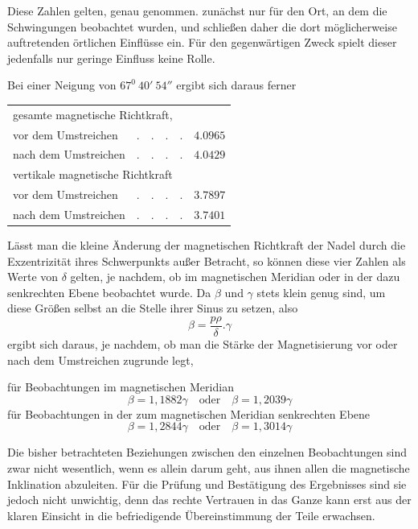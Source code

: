 Diese Zahlen gelten, genau genommen. zunächst nur für den Ort, an dem die Schwingungen beobachtet wurden, und schließen daher die dort möglicherweise auftretenden örtlichen Einflüsse ein. Für den gegenwärtigen Zweck spielt dieser jedenfalls nur geringe Einfluss keine Rolle.

Bei einer Neigung von $67^0\ 40'\ 54''$ ergibt sich daraus ferner
\begin{center}
\begin{tabular}{llr}
\multicolumn{3}{l}{gesamte magnetische Richtkraft,}\\
\quad vor dem Umstreichen&$.\quad.\quad.\quad.$&$4.0965$\\
\quad nach dem Umstreichen&$.\quad.\quad.\quad.$&$4.0429$\\
\multicolumn{3}{l}{vertikale magnetische Richtkraft}\\
\quad vor dem Umstreichen&$.\quad.\quad.\quad.$&$3.7897$\\
\quad nach dem Umstreichen&$.\quad.\quad.\quad.$&$3.7401$
\end{tabular}
\end{center}

Lässt man die kleine Änderung der magnetischen Richtkraft der Nadel durch die Exzentrizität ihres Schwerpunkts außer Betracht, so können diese vier Zahlen als Werte von $\delta$ gelten, je nachdem, ob im magnetischen Meridian oder in der dazu senkrechten Ebene beobachtet wurde. Da $\beta$ und $\gamma$ stets klein genug sind, um diese Größen selbst an die Stelle ihrer Sinus zu setzen, also
\[
\beta=\frac{p\rho}{\delta}.\gamma
\]
ergibt sich daraus, je nachdem, ob man die Stärke der Magnetisierung vor oder nach dem Umstreichen zugrunde legt,

für Beobachtungen im magnetischen Meridian
\[
\beta=1{,}1882\gamma\quad\text{oder}\quad\beta=1{,}2039\gamma
\]
für Beobachtungen in der zum magnetischen Meridian senkrechten Ebene
\[
\beta=1{,}2844\gamma\quad\text{oder}\quad\beta=1{,}3014\gamma
\]


Die bisher betrachteten Beziehungen zwischen den einzelnen Beobachtungen sind zwar nicht wesentlich, wenn es allein darum geht, aus ihnen allen die magnetische Inklination abzuleiten. Für die Prüfung und Bestätigung des Ergebnisses sind sie jedoch nicht unwichtig, denn das rechte Vertrauen in das Ganze kann erst aus der klaren Einsicht in die befriedigende Übereinstimmung der Teile erwachsen.

